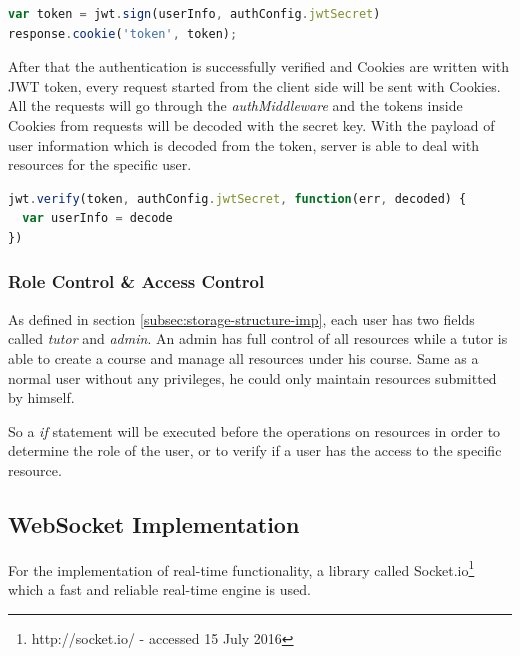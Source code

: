 \begin{lstlisting}[language=JavaScript, caption=JWT encodes user information with secret key, label={list:jwt-encode-imp}]
var token = jwt.sign(userInfo, authConfig.jwtSecret)
response.cookie('token', token);
\end{lstlisting}

After that the authentication is successfully verified and Cookies are written with JWT token, every request started from the client side will be sent with Cookies. All the requests will go through the \textit{authMiddleware} and the tokens inside Cookies from requests will be decoded with the secret key. With the payload of user information which is decoded from the token, server is able to deal with resources for the specific user.

\begin{lstlisting}[language=JavaScript, caption=JWT decodes user information with secret key, label={list:jwt-decode-imp}]
jwt.verify(token, authConfig.jwtSecret, function(err, decoded) {
  var userInfo = decode
})
\end{lstlisting}

\subsubsection{Role Control \& Access Control}
As defined in section \ref{subsec:storage-structure-imp}, each user has two fields called \textit{tutor} and \textit{admin}. An admin has full control of all resources while a tutor  is able to create a course and manage all resources under his course. Same as a normal user without any privileges, he could only maintain resources submitted by himself.

So a \textit{if} statement will be executed before the operations on resources in order to determine the role of the user, or to verify if a user has the access to the specific resource.




\subsection{WebSocket Implementation}
For the implementation of real-time functionality, a library called Socket.io\footnote{http://socket.io/ - accessed 15 July 2016} which a fast and reliable real-time engine is used. 


